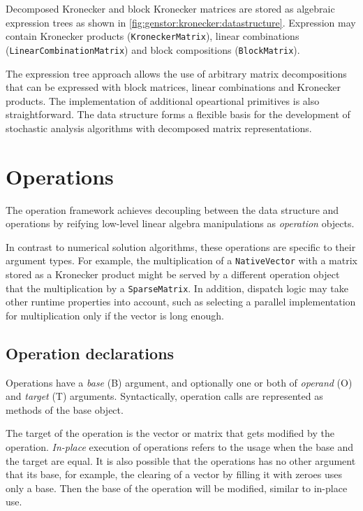 Decomposed Kronecker and block Kronecker matrices are stored as
algebraic expression trees as shown in
\cref{fig:genstor:kronecker:datastructure}. Expression may contain
Kronecker products (\texttt{KroneckerMatrix}), linear combinations
(\texttt{LinearCombinationMatrix}) and block compositions
(\texttt{BlockMatrix}).

The expression tree approach allows the use of arbitrary matrix
decompositions that can be expressed with block matrices, linear
combinations and Kronecker products. The implementation of additional
opeartional primitives is also straightforward. The data structure
forms a flexible basis for the development of stochastic analysis
algorithms with decomposed matrix representations.

\section{Operations}

The operation framework achieves decoupling between the data structure
and operations by reifying low-level linear algebra manipulations as
\emph{operation} objects.

In contrast to numerical solution algorithms, these operations are
specific to their argument types. For example, the multiplication of a
\texttt{NativeVector} with a matrix stored as a Kronecker product
might be served by a different operation object that the
multiplication by a \texttt{SparseMatrix}. In addition, dispatch logic
may take other runtime properties into account, such as selecting a
parallel implementation for multiplication only if the vector is long
enough.

\subsection{Operation declarations}

Operations have a \emph{base} (B) argument, and optionally one or
both of \emph{operand} (O) and \emph{target} (T)
arguments. Syntactically, operation calls are represented as methods
of the base object.

The target of the operation is the vector or matrix that gets modified
by the operation. \emph{In-place} execution of operations refers to
the usage when the base and the target are equal. It is also possible
that the operations has no other argument that its base, for example,
the clearing of a vector by filling it with zeroes uses only a
base. Then the base of the operation will be modified, similar to
in-place use.

